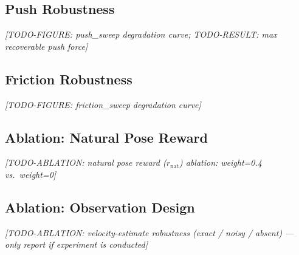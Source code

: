 \documentclass[conference]{IEEEtran}
\begin{document}

\subsection{Push Robustness}
\textit{[TODO-FIGURE: push\_sweep degradation curve;
TODO-RESULT: max recoverable push force]}

\subsection{Friction Robustness}
\textit{[TODO-FIGURE: friction\_sweep degradation curve]}

\subsection{Ablation: Natural Pose Reward}
\textit{[TODO-ABLATION: natural pose reward ($r_{\mathrm{nat}}$)
ablation: weight=0.4 vs.\ weight=0]}

\subsection{Ablation: Observation Design}
\textit{[TODO-ABLATION: velocity-estimate robustness (exact / noisy / absent)
--- only report if experiment is conducted]}
\end{document}
